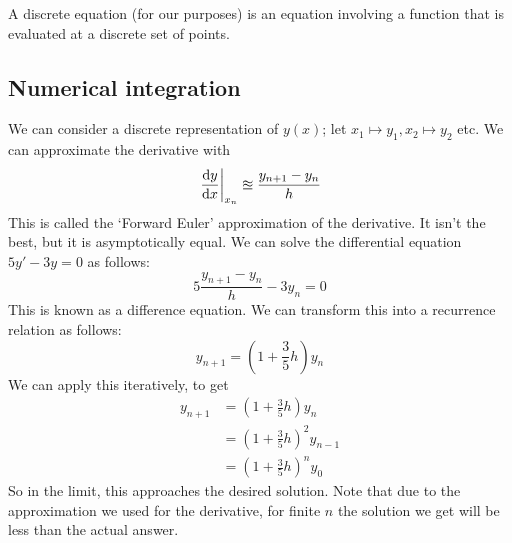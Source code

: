 A discrete equation (for our purposes) is an equation involving a function that is evaluated at a discrete set of points.

\subsection{Numerical integration}
We can consider a discrete representation of \(y(x)\); let \(x_1 \mapsto y_1, x_2 \mapsto y_2\) etc.
We can approximate the derivative with
\[
	\eval{\frac{\dd{y}}{\dd{x}}}_{x_n} \approxeq \frac{y_{n+1} - y_n}{h}
\]
This is called the `Forward Euler' approximation of the derivative.
It isn't the best, but it is asymptotically equal.
We can solve the differential equation \(5y' - 3y = 0\) as follows:
\[
	5 \frac{y_{n+1} - y_n}{h} - 3y_n = 0
\]
This is known as a difference equation.
We can transform this into a recurrence relation as follows:
\[
	y_{n+1} = \left( 1 + \frac{3}{5}h \right) y_n
\]
We can apply this iteratively, to get
\begin{align*}
	y_{n+1} & = \left( 1 + \frac{3}{5}h \right) y_n       \\
	        & = \left( 1 + \frac{3}{5}h \right)^2 y_{n-1} \\
	        & = \left( 1 + \frac{3}{5}h \right)^n y_{0}
\end{align*}
So in the limit, this approaches the desired solution.
Note that due to the approximation we used for the derivative, for finite \(n\) the solution we get will be less than the actual answer.

